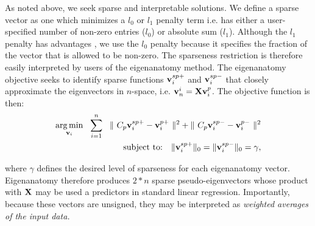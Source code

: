 \documentclass{llncs}
\newcommand{\X}{{\bf X}}
\newcommand{\vv}{{\bf v}}
\begin{document}
As noted above, we seek sparse and interpretable solutions.  We define a sparse vector as one which minimizes a $l_0$ or $l_1$ penalty term i.e. has either a user-specified number of non-zero entries ($l_0$) or absolute sum ($l_1$).  Although the $l_1$ penalty has advantages \cite{sparsePCA_zou},  we use the $l_0$ penalty because it specifies the fraction of the vector that is allowed to be non-zero.  The sparseness restriction is therefore easily interpreted by users of the eigenanatomy method.  The eigenanatomy objective seeks to identify sparse functions $\vv_i^{sp+}$ and $\vv_i^{sp-}$ that closely approximate the eigenvectors in $n$-space, i.e. $\vv^i_n=\X \vv_i^p$.  The objective function is then:
\begin{eqnarray}
\label{eq:eigenanatomy}
\underset{\vv_i}{\operatorname{arg\,min}}~~\sum^n_{i=1}~~\|~C_p \vv_i^{sp+} - \vv_i^{p+} ~\|^2 + \|~C_p \vv_i^{sp-} - \vv_i^{p-} ~\|^2 \\ 
\text{subject to:}~~~  \| \vv_i^{sp+} \|_0 =  \| \vv_i^{sp-} \|_0 = \gamma,\notag
\end{eqnarray}

where $\gamma$ defines the desired level of sparseness for each eigenanatomy vector.  
Eigenanatomy therefore produces $2*n$ sparse pseudo-eigenvectors whose product with $\X$ may be used a predictors in standard linear regression.  Importantly, because these vectors are unsigned, they may be interpreted as {\em weighted averages of the input data.}  
\end{document}
